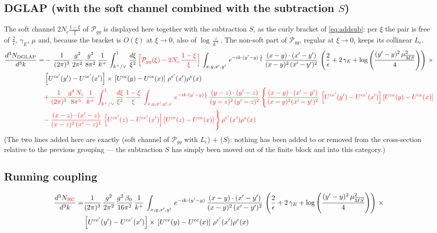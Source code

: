 \documentclass[9pt]{article}
\newcommand{\Leps}{L_{\epsilon}}
\numberwithin{equation}{section}
\begin{document}
\subsection{DGLAP {\color{red}(with the soft channel combined with the subtraction $S$)}}
{\color{red}The soft channel $2N_{c}\frac{1-\xi}{\xi}$ of $\mathcal P_{gg}$ is displayed here
together with the subtraction $S$, as the curly bracket of \eqref{eq:addsub}: per $\xi$ the
pair is free of $\frac{2}{\epsilon}$, $\gamma_{E}$, $\mu$ and, because the bracket is $O(\xi)$
at $\xi\to0$, also of $\log\frac{\vee}{k^{+}}$. The non-soft part of $\mathcal P_{gg}$, regular
at $\xi\to0$, keeps its collinear $\Leps$.}
\begin{align}
    \frac{d^{3}N_{\rm DGLAP}}{d^{3}k} = &   -\,\frac{1}{(2\pi)^{3}}\,\frac{g^{2}}{2\pi^{2}}\,\frac{g^{2}}{8\pi^{2}}\,\frac{1}{k^{+}}\,\int_{k^{+}/\vee}^{1}\, \frac{d\xi}{\xi^{2}}\,{\color{red}\Big[\mathcal{P}_{gg}(\xi)-2N_{c}\,\frac{1-\xi}{\xi}\Big]}\,\int_{x,y,x',y'}\, e^{-ik\cdot (y'-y)\,\frac{1}{\xi}}\, \frac{(x-y)\cdot (x'-y')}{(x-y)^{2}\,(x'-y')^{2}}\,\left(\frac{2}{\epsilon}+2\,\gamma_{E}+\log{\left(\frac{(y'-y)^{2}\,\mu^{2}_{\overline{MS}}}{4}\right)}\right)\,\times\notag \\ &  \left[U^{ce'}(y') - U^{ce'}(x')\right] \times\, \left[U^{ce}(y) - U^{ce}(x)\right]\, \rho^{e'}(x') \rho^{e}(x)\notag \\ &
{\color{red}+\,\frac{1}{(2\pi)^{3}}\frac{g^{4}\,N_{c}}{8\pi^{5}}\,\frac{1}{k^{+}}\,\int_{k^{+}/\vee}^{1}\frac{d\xi}{\xi^{2}}\,\frac{1-\xi}{\xi}\,\int_{x,y,x',y',z}\,e^{-ik\cdot(y'-y)\frac{1}{\xi}}\,\frac{(y-z)\cdot (y'-z)}{(y-z)^{2}\, (y'-z)^{2}}\,\Bigg\{\frac{(x-y)\cdot(x'-y')}{(x-y)^{2}(x'-y')^{2}}\,\left[U^{ce'}(y')-U^{ce'}(x')\right]\left[U^{ce}(y)-U^{ce}(x)\right]}\notag \\ & {\color{red}-\,\frac{(x-z)\cdot (x'-z)}{(x-z)^{2}\, (x'-z)^{2}}\,\left[U^{ce'}(z)-U^{ce'}(x')\right]\left[U^{ce}(z)-U^{ce}(x)\right]\Bigg\}\,\rho^{e'}(x')\rho^{e}(x)}
\end{align}
{\color{red}(The two lines added here are exactly (soft channel of $\mathcal P_{gg}$ with
$\Leps$) $+$ ($S$): nothing has been added to or removed from the cross-section relative to
the previous grouping --- the subtraction $S$ has simply been moved out of the finite block
and into this category.)}
\subsection{Running coupling}
\begin{align}
\frac{d^{3}N_{\rm {\color{red}RC}}}{d^{3}k} = &   \frac{1}{(2\pi)^{3}}\, \frac{g^{2}}{2\pi^{2}}\,\frac{g^{2}\,\beta_{0}}{16\pi^{2}}\, \frac{1}{k^{+}}\,\int_{x,y,x',y'}\, e^{-ik\cdot (y'-y)}\, \frac{(x-y)\cdot (x'-y')}{(x-y)^{2}\,(x'-y')^{2}}\,\left(\frac{2}{\epsilon}+2\,\gamma_{E}+\log{\left(\frac{(y'-y)^{2}\,\mu^{2}_{\overline{MS}}}{4}\right)}\right)\,\times\notag \\ &  \left[U^{ce'}(y') - U^{ce'}(x')\right] \times\, \left[U^{ce}(y) - U^{ce}(x)\right]\, \rho^{e'}(x') \rho^{e}(x)
\end{align}
\end{document}
